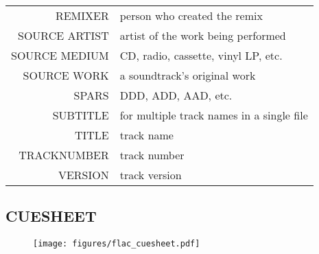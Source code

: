 \begin{minipage}{\linewidth}
{\begin{tabular}{|r|l|}
REMIXER\footnotemark[\value{mpfootnote}] & person who created the remix \\
SOURCE ARTIST\footnotemark[\value{mpfootnote}] & artist of the work being performed \\
SOURCE MEDIUM\footnotemark[\value{mpfootnote}] & CD, radio, cassette, vinyl LP, etc. \\
SOURCE WORK\footnotemark[\value{mpfootnote}] & a soundtrack's original work \\
SPARS\footnotemark[\value{mpfootnote}] & DDD, ADD, AAD, etc. \\
SUBTITLE\footnotemark[\value{mpfootnote}] & for multiple track names in a single file \\
TITLE & track name \\
TRACKNUMBER & track number \\
VERSION & track version \\
\hline
\end{tabular}
}
\end{minipage}

\pagebreak

\subsection{CUESHEET}
\begin{figure}[h]
\texttt{[image: figures/flac\_cuesheet.pdf]}
\end{figure}

